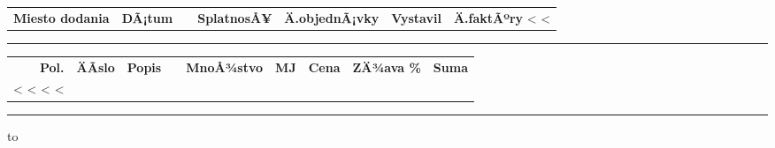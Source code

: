 \documentclass[twoside]{article}
\begin{document}
{\begin{tabularx}{\textwidth}
\hspace{-3mm}
\begin{tabularx}{\textwidth}{>{\hsize=2.1cm\centering}X@{\ }
                             >{\hsize=2.8cm\centering}X@{\ }
                             >{\hsize=2.8cm\centering}X@{\ }
                             >{\hsize=2.8cm\centering}X@{\ }
                             >{\hsize=3.4cm\centering}X@{\ }
                             >{\hsize=2.5cm\centering}X@{\ }
                             >{\hsize=2.0cm\raggedleft}X@{}}
  \textbf{Miesto dodania} & \textbf{DÃ¡tum} & \textbf{ } &
  \textbf{SplatnosÅ¥} & \textbf{Ä.objednÃ¡vky} & \textbf{Vystavil} & \textbf{Ä.faktÃºry} 
  \cr
  <%
  <%
\end{tabularx}


\vspace{5mm}

\rule{\textwidth}{1.5pt}

\vspace{3mm}

\hspace{-3mm}
{\scriptsize

\begin{tabularx}{\textwidth}{@{}rlXlrlrrr@{}}
  \textbf{Pol.} & \textbf{ÄÃ­slo} & \textbf{Popis} & & \textbf{MnoÅ¾stvo} &
    \textbf{MJ} & \textbf{Cena} & \textbf{ZÄ¾ava \%} & \textbf{Suma} \\ [0.5em]
<%
  <%
  <%
<%
\end{tabularx}


\rule{\textwidth}{1.5pt}

\hbox to}
\end{tabularx}}
\end{document}
